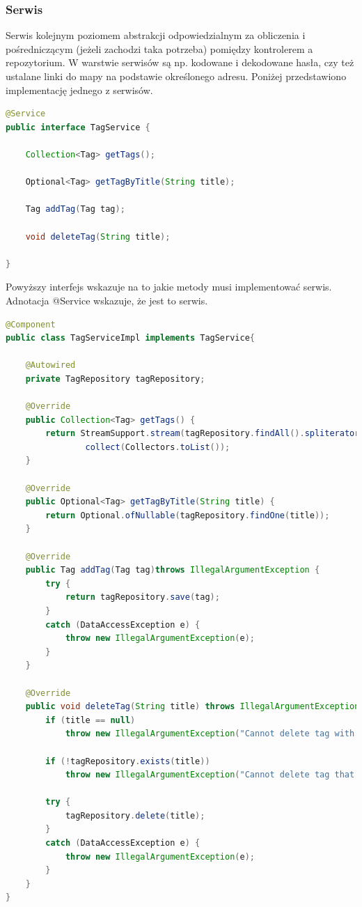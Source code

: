 \documentclass{report}
\begin{document}
			
			\subsubsection{Serwis}
			
Serwis kolejnym poziomem abstrakcji odpowiedzialnym za obliczenia i pośredniczącym (jeżeli zachodzi taka potrzeba) pomiędzy kontrolerem a repozytorium. W warstwie serwisów są np. kodowane i dekodowane hasła, czy też ustalane linki do mapy na podstawie określonego adresu. Poniżej przedstawiono implementację jednego z serwisów.			

\begin{lstlisting}[language=Java, breaklines]
@Service
public interface TagService {

    Collection<Tag> getTags();

    Optional<Tag> getTagByTitle(String title);

    Tag addTag(Tag tag);

    void deleteTag(String title);

}
\end{lstlisting}

Powyższy interfejs wskazuje na to jakie metody musi implementować serwis. Adnotacja @Service wskazuje, że jest to serwis.

\begin{lstlisting}[language=Java, breaklines]
@Component
public class TagServiceImpl implements TagService{

    @Autowired
    private TagRepository tagRepository;

    @Override
    public Collection<Tag> getTags() {
        return StreamSupport.stream(tagRepository.findAll().spliterator(), false).
                collect(Collectors.toList());
    }

    @Override
    public Optional<Tag> getTagByTitle(String title) {
        return Optional.ofNullable(tagRepository.findOne(title));
    }

    @Override
    public Tag addTag(Tag tag)throws IllegalArgumentException {
        try {
            return tagRepository.save(tag);
        }
        catch (DataAccessException e) {
            throw new IllegalArgumentException(e);
        }
    }

    @Override
    public void deleteTag(String title) throws IllegalArgumentException {
        if (title == null)
            throw new IllegalArgumentException("Cannot delete tag with unspecified title");

        if (!tagRepository.exists(title))
            throw new IllegalArgumentException("Cannot delete tag that does not exist");

        try {
            tagRepository.delete(title);
        }
        catch (DataAccessException e) {
            throw new IllegalArgumentException(e);
        }
    }
}
\end{lstlisting}
\end{document}
